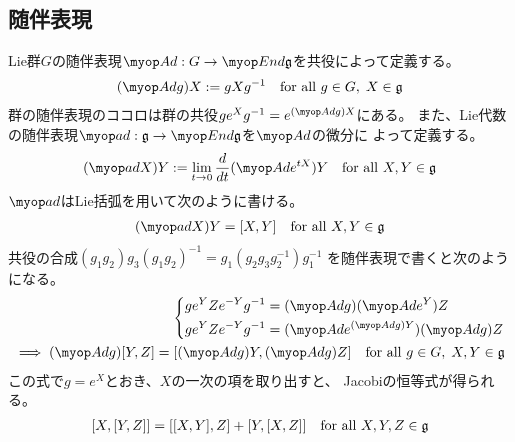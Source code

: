 {\subsection{随伴表現}\label{s2:随伴表現} %
	Lie群$G$の随伴表現$\Ad:G\to\End\frk{g}$を共役によって定義する。
	\begin{equation*}\begin{split}
		(\Ad g)X := gXg^{-1} \quad\text{for all } g\in G,\; X\in\frk{g}
	\end{split}\end{equation*}
	群の随伴表現のココロは群の共役$ge^Xg^{-1}=e^{(\Ad g)X}$にある。
	また、Lie代数の随伴表現$\ad:\frk{g}\to\End\frk{g}$を$\Ad$の微分に
	よって定義する。
	\begin{equation*}\begin{split}
		(\ad X)Y := \lim_{t\to0}\frac{d}{dt}(\Ad e^{tX})Y
		\quad\text{for all } X,Y\in\frk{g}
	\end{split}\end{equation*}
	$\ad$はLie括弧を用いて次のように書ける。
	\begin{equation*}\begin{split}
		(\ad X)Y = [X, Y] \quad\text{for all } X,Y\in\frk{g}
	\end{split}\end{equation*}
	共役の合成$(g_1g_2)g_3(g_1g_2)^{-1}=g_1(g_2g_3g_2^{-1})g_1^{-1}$
	を随伴表現で書くと次のようになる。
	\begin{equation}\label{eq:随伴表現その一}\begin{split}
		\left\{\begin{split}
			ge^YZe^{-Y}g^{-1} &= (\Ad g)(\Ad e^Y)Z \\
			ge^YZe^{-Y}g^{-1} &= (\Ad e^{(\Ad g)Y})(\Ad g)Z \\
		\end{split}\right. \\
		\implies (\Ad g)[Y,Z] = [(\Ad g)Y, (\Ad g)Z]
		\quad\text{for all } g\in G,\; X,Y\in\frk{g}
	\end{split}\end{equation}
	この式で$g=e^X$とおき、$X$の一次の項を取り出すと、
	Jacobiの恒等式が得られる。
	\begin{equation*}\begin{split}
		[X,[Y,Z]] = [[X,Y],Z] + [Y,[X,Z]] \quad\text{for all } X,Y,Z\in\mathfrak{g}
	\end{split}\end{equation*}

}
